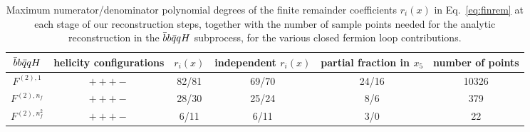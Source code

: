 \documentclass[main.tex]{subfiles}
\begin{document}
\begin{table}[t!]
\centering
\begin{tabularx}{0.95\textwidth}{|C{0.8}|C{1.2}|C{0.8}|C{1.0}|C{1.2}|C{1.0}|}
\hline
 $\bar{b}b\bar{q}qH$     & helicity configurations & $r_i(x)$ & independent $r_i(x)$ & partial fraction in $x_5$ & number of points \\
\hline
$F^{(2),1}$ & $+++-$ & 82/81 & 69/70 & 24/16 & 10326 \\
\hline
$F^{(2),n_f}$ & $+++-$ & 28/30 & 25/24 & 8/6 & 379 \\
\hline
$F^{(2),n_f^2}$ & $+++-$ & 6/11  & 6/11  & 3/0 & 22 \\
\hline
\end{tabularx}
\caption{\label{tab:degrees2q2bH} Maximum numerator/denominator polynomial degrees of the finite remainder coefficients $r_i(x)$ in Eq.~\eqref{eq:finrem} 
at each stage of our reconstruction steps, together with the number of sample points needed for the analytic reconstruction in the $\bar{b}b\bar{q}qH$ subprocess, for the various closed fermion loop contributions.}
\end{table}
\end{document}
